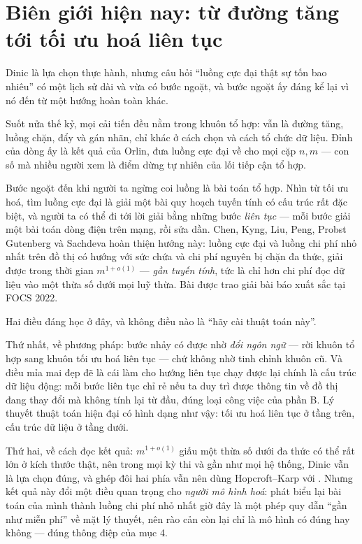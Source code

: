 \documentclass[../../algorithm.tex]{subfiles}
\begin{document}
\section{Biên giới hiện nay: từ đường tăng tới tối ưu hoá liên tục}

Dinic là lựa chọn thực hành, nhưng câu hỏi ``luồng cực đại thật sự tốn bao nhiêu'' có một lịch sử dài và vừa có bước ngoặt, và bước ngoặt ấy đáng kể lại vì nó đến từ một hướng hoàn toàn khác.

Suốt nửa thế kỷ, mọi cải tiến đều nằm trong khuôn tổ hợp: vẫn là đường tăng, luồng chặn, đẩy và gán nhãn, chỉ khác ở cách chọn và cách tổ chức dữ liệu. Đỉnh của dòng ấy là kết quả của Orlin\cite{orlin2013}, đưa luồng cực đại về  cho mọi cặp \(n, m\) --- con số mà nhiều người xem là điểm dừng tự nhiên của lối tiếp cận tổ hợp.

Bước ngoặt đến khi người ta ngừng coi luồng là bài toán tổ hợp. Nhìn từ tối ưu hoá, tìm luồng cực đại là giải một bài quy hoạch tuyến tính có cấu trúc rất đặc biệt, và người ta có thể đi tới lời giải bằng những bước \emph{liên tục} --- mỗi bước giải một bài toán dòng điện trên mạng, rồi sửa dần. Chen, Kyng, Liu, Peng, Probst Gutenberg và Sachdeva\cite{chen2022} hoàn thiện hướng này: luồng cực đại và luồng chi phí nhỏ nhất trên đồ thị có hướng với sức chứa và chi phí nguyên bị chặn đa thức, giải được trong thời gian \(m^{1+o(1)}\) --- \emph{gần tuyến tính}, tức là chỉ hơn chi phí đọc dữ liệu vào một thừa số dưới mọi luỹ thừa. Bài được trao giải bài báo xuất sắc tại FOCS 2022.

Hai điều đáng học ở đây, và không điều nào là ``hãy cài thuật toán này''.

Thứ nhất, về phương pháp: bước nhảy có được nhờ \emph{đổi ngôn ngữ} --- rời khuôn tổ hợp sang khuôn tối ưu hoá liên tục --- chứ không nhờ tinh chỉnh khuôn cũ. Và điều mỉa mai đẹp đẽ là cái làm cho hướng liên tục chạy được lại chính là cấu trúc dữ liệu động: mỗi bước liên tục chỉ rẻ nếu ta duy trì được thông tin về đồ thị đang thay đổi mà không tính lại từ đầu, đúng loại công việc của phần B. Lý thuyết thuật toán hiện đại có hình dạng như vậy: tối ưu hoá liên tục ở tầng trên, cấu trúc dữ liệu ở tầng dưới.

Thứ hai, về cách đọc kết quả: \(m^{1+o(1)}\) giấu một thừa số dưới đa thức có thể rất lớn ở kích thước thật, nên trong mọi kỳ thi và gần như mọi hệ thống, Dinic vẫn là lựa chọn đúng, và ghép đôi hai phía vẫn nên dùng Hopcroft--Karp\cite{hopcroft1973} với . Nhưng kết quả này đổi một điều quan trọng cho \emph{người mô hình hoá}: phát biểu lại bài toán của mình thành luồng chi phí nhỏ nhất giờ đây là một phép quy dẫn ``gần như miễn phí'' về mặt lý thuyết, nên rào cản còn lại chỉ là mô hình có đúng hay không --- đúng thông điệp của mục 4.
\end{document}
